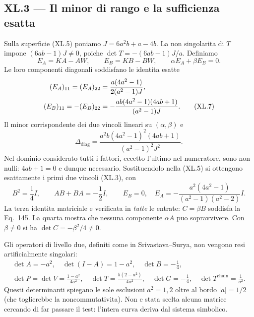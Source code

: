 \documentclass[11pt,a4paper]{article}
\begin{document}
\clearpage
\subsection*{XL.3 --- Il minor di rango e la sufficienza esatta}
Sulla superficie (XL.5) poniamo $J=6a^2b+a-4b$. La non singolarita di $T$ impone $(6ab-1)J\ne0$, poiche $\det T=-(6ab-1)J/a$. Definiamo
\begin{equation}
 E_A=KA-AW,\qquad E_B=KB-BW,\qquad\alpha E_A+\beta E_B=0.\tag{XL.6}
\end{equation}
Le loro componenti diagonali soddisfano le identita esatte
\begin{align}
 (E_A)_{11}=(E_A)_{22}&=\frac{a(4a^2-1)}{2(a^2-1)J},\notag\\
 (E_B)_{11}=-(E_B)_{22}&=-\frac{ab(4a^2-1)(4ab+1)}{(a^2-1)J}.\tag{XL.7}
\end{align}
Il minor corrispondente dei due vincoli lineari su $(\alpha,\beta)$ e
\begin{equation}
 \boxed{\;\Delta_{\mathrm{diag}}=
 \frac{a^2b(4a^2-1)^2(4ab+1)}{(a^2-1)^2J^2}.\;}\tag{XL.8}
\end{equation}
Nel dominio considerato tutti i fattori, eccetto l'ultimo nel numeratore, sono non nulli: $4ab+1=0$ e dunque necessario. Sostituendolo nella (XL.5) si ottengono esattamente i primi due vincoli (XL.3), con
\begin{equation}
 B^2=\frac14 I,\qquad AB+BA=-\frac12 I,\qquad
 E_B=0,\quad E_A=-\frac{a^2(4a^2-1)}{(a^2-1)(a^2-2)}I.\tag{XL.9}
\end{equation}
La terza identita matriciale e verificata in \emph{tutte} le entrate: $C=\beta B$ soddisfa la Eq.~145. La quarta mostra che nessuna componente $\alpha A$ puo sopravvivere. Con $\beta\ne0$ si ha $\det C=-\beta^2/4\ne0$.

Gli operatori di livello due, definiti come in Srivastava--Surya, non vengono resi artificialmente singolari:
\begin{equation}
\begin{gathered}
\det A=-a^2,\quad \det(I-A)=1-a^2,\quad \det B=-\tfrac14,\\
\det P=\det V=\frac{1-a^2}{4a^2},\quad
\det T=\frac{5(2-a^2)}{4a^2},\quad
\det G=-\tfrac14,\quad\det T^{\mathrm{chain}}=\frac1{a^2}.\tag{XL.10}
\end{gathered}
\end{equation}
Questi determinanti spiegano le sole esclusioni $a^2=1,2$ oltre al bordo $|a|=1/2$ (che toglierebbe la noncommutativita). Non e stata scelta alcuna matrice cercando di far passare il test: l'intera curva deriva dal sistema simbolico.
\end{document}
